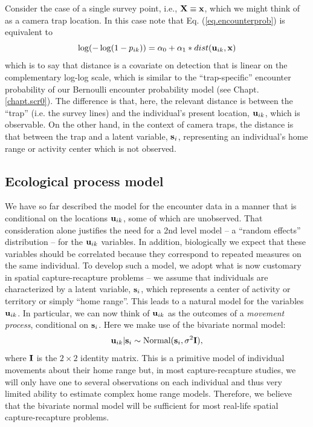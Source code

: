 Consider the case of a single survey point, i.e., ${\bf X} \equiv {\bf
  x}$, which we might think of as a camera trap location.  In this
case note that Eq. (\ref{eq.encounterprob}) is equivalent to
\[
\log(-\log(1-p_{ik})) = \alpha_{0} + \alpha_{1}*dist( {\bf u}_{ik},{\bf x})
\]
which is to say that distance is a covariate on detection that is
linear on the complementary log-log scale, which is similar to the
``trap-specific'' encounter probability of our Bernoulli encounter
probability model (see Chapt. \ref{chapt.scr0}).
The difference is that, here, the relevant distance
is between the ``trap'' (i.e. the survey lines) and the individual's
present location, ${\bf u}_{ik}$, which is observable. On the other
hand, in the context of camera traps, the distance is that between the
trap and a latent variable, ${\bf s}_{i}$, representing an
individual's home range or activity center which is not observed.


\subsection{Ecological process model } 

We have so far described the model for the encounter data in a manner
that is conditional on the locations ${\bf u}_{ik}$, some of which are
unobserved. That consideration alone justifies the need for a 2nd
level model -- a ``random effects'' distribution -- for the ${\bf
  u}_{ik}$ variables. In addition, biologically we expect that these
variables should be correlated because they correspond to repeated
measures on the same individual.  To develop such a model, we adopt
what is now customary in spatial capture-recapture problems -- we
assume that individuals are characterized by a latent variable, ${\bf
  s}_{i}$, which represents a center of activity or territory or
simply ``home range''. This leads to a natural model for the variables
${\bf u}_{ik}$. In particular, we can now think of ${\bf u}_{ik}$ as
the outcomes of a {\it movement process}, conditional on ${\bf
  s}_{i}$. Here we make use of the bivariate normal model:
\[
 {\bf u}_{ik} | {\bf s}_{i} \sim \mbox{Normal}({\bf s}_{i}, \sigma^{2}{\bf I}),
\]
where ${\bf I}$ is the $2\times 2$ identity matrix.  This is a
primitive model of individual movements about their home range but, in
most capture-recapture studies, we will only have one to several
observations on each individual and thus very limited ability to
estimate complex home range models. Therefore, we believe that the
bivariate normal model will be sufficient for most real-life spatial
capture-recapture problems.

